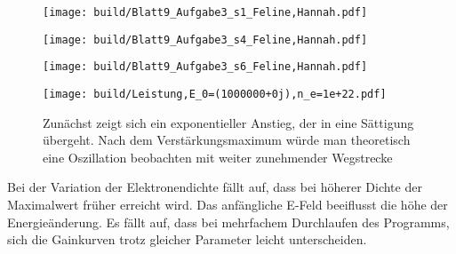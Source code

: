 \documentclass[11pt,a4paper]{article}
\begin{document}
	\begin{figure}
		\texttt{[image: build/Blatt9\_Aufgabe3\_s1\_Feline,Hannah.pdf]}
		\centering
		\label{fig:0meter}
	\end{figure}

	\begin{figure}
		\texttt{[image: build/Blatt9\_Aufgabe3\_s4\_Feline,Hannah.pdf]}
		\centering
		\label{fig:4meter}
	\end{figure}

	\begin{figure}
		\texttt{[image: build/Blatt9\_Aufgabe3\_s6\_Feline,Hannah.pdf]}
		\centering
		\label{fig:6meter}
	\end{figure}

 	\begin{figure}
		\texttt{[image: build/Leistung,E\_0=(1000000+0j),n\_e=1e+22.pdf]}
		\centering
		\caption{Zunächst zeigt sich ein exponentieller Anstieg, der in eine Sättigung übergeht. Nach dem Verstärkungsmaximum würde man theoretisch eine Oszillation beobachten mit weiter zunehmender Wegstrecke}
		\label{fig:gain}
	\end{figure}

	Bei der Variation der Elektronendichte fällt auf, 
	dass bei höherer Dichte der Maximalwert früher erreicht wird.
	Das anfängliche E-Feld beeiflusst die höhe der Energieänderung.
	Es fällt auf, dass bei mehrfachem Durchlaufen des Programms, sich die Gainkurven trotz gleicher Parameter leicht unterscheiden.
\end{document}
